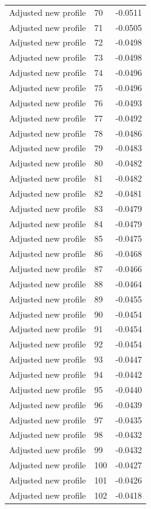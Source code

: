 \begin{table}[htbp]
\begin{tabular}{lll}
Adjusted new profile & 70 & -0.0511 \\
Adjusted new profile & 71 & -0.0505 \\
Adjusted new profile & 72 & -0.0498 \\
Adjusted new profile & 73 & -0.0498 \\
Adjusted new profile & 74 & -0.0496 \\
Adjusted new profile & 75 & -0.0496 \\
Adjusted new profile & 76 & -0.0493 \\
Adjusted new profile & 77 & -0.0492 \\
Adjusted new profile & 78 & -0.0486 \\
Adjusted new profile & 79 & -0.0483 \\
Adjusted new profile & 80 & -0.0482 \\
Adjusted new profile & 81 & -0.0482 \\
Adjusted new profile & 82 & -0.0481 \\
Adjusted new profile & 83 & -0.0479 \\
Adjusted new profile & 84 & -0.0479 \\
Adjusted new profile & 85 & -0.0475 \\
Adjusted new profile & 86 & -0.0468 \\
Adjusted new profile & 87 & -0.0466 \\
Adjusted new profile & 88 & -0.0464 \\
Adjusted new profile & 89 & -0.0455 \\
Adjusted new profile & 90 & -0.0454 \\
Adjusted new profile & 91 & -0.0454 \\
Adjusted new profile & 92 & -0.0454 \\
Adjusted new profile & 93 & -0.0447 \\
Adjusted new profile & 94 & -0.0442 \\
Adjusted new profile & 95 & -0.0440 \\
Adjusted new profile & 96 & -0.0439 \\
Adjusted new profile & 97 & -0.0435 \\
Adjusted new profile & 98 & -0.0432 \\
Adjusted new profile & 99 & -0.0432 \\
Adjusted new profile & 100 & -0.0427 \\
Adjusted new profile & 101 & -0.0426 \\
Adjusted new profile & 102 & -0.0418 \\

\end{tabular}
\end{table}
